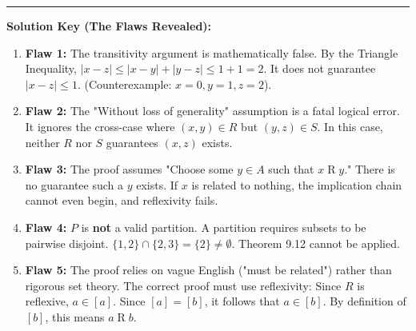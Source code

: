 \documentclass[11pt, a4paper]{article}
\theoremstyle{definition}
\theoremstyle{remark}
\begin{document}
\vspace{1em}
\hrule
\vspace{1em}
\textbf{Solution Key (The Flaws Revealed):}
\begin{enumerate}
    \item \textbf{Flaw 1:} The transitivity argument is mathematically false. By the Triangle Inequality, $|x - z| \le |x - y| + |y - z| \le 1 + 1 = 2$. It does not guarantee $|x - z| \le 1$. (Counterexample: $x=0, y=1, z=2$).
    \item \textbf{Flaw 2:} The "Without loss of generality" assumption is a fatal logical error. It ignores the cross-case where $(x,y) \in R$ but $(y,z) \in S$. In this case, neither $R$ nor $S$ guarantees $(x,z)$ exists.
    \item \textbf{Flaw 3:} The proof assumes "Choose some $y \in A$ such that $x \mathrel{R} y$." There is no guarantee such a $y$ exists. If $x$ is related to nothing, the implication chain cannot even begin, and reflexivity fails.
    \item \textbf{Flaw 4:} $P$ is \textbf{not} a valid partition. A partition requires subsets to be pairwise disjoint. $\{1, 2\} \cap \{2, 3\} = \{2\} \neq \emptyset$. Theorem 9.12 cannot be applied.
    \item \textbf{Flaw 5:} The proof relies on vague English ("must be related") rather than rigorous set theory. The correct proof must use reflexivity: Since $R$ is reflexive, $a \in [a]$. Since $[a] = [b]$, it follows that $a \in [b]$. By definition of $[b]$, this means $a \mathrel{R} b$.
\end{enumerate}
\end{document}
